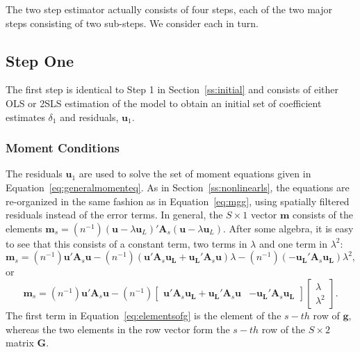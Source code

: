 \documentclass{article}
\begin{document}
 The two step estimator actually consists of four steps, each of the two major
 steps consisting of two sub-steps. We consider each in turn.
 
 \subsection{Step One}
 The first step is identical to Step 1 in Section~\ref{ss:initial} and consists of either
 OLS or 2SLS estimation of the model to obtain an initial set of 
 coefficient estimates $\delta_1$ and residuals, $\mathbf{u}_1$.
 
 \subsubsection{Moment Conditions}
 The residuals $\mathbf{u}_1$ are used to solve the set of moment equations given
 in Equation~\ref{eq:generalmomenteq}. As in Section~\ref{ss:nonlinearls}, the 
 equations are re-organized in the same fashion as in Equation~\ref{eq:mgg},
 using spatially filtered residuals instead of the error terms. 
 In general, the $S \times 1$ vector $\mathbf{m}$ consists of the elements
 $\mathbf{m}_s = (n^{-1}) (\mathbf{u} - \lambda \mathbf{u}_L) ' \mathbf{A}_s (\mathbf{u} - \lambda \mathbf{u}_L)$. After some algebra, it is easy to see that this consists of a constant term, two terms
 in $\lambda$ and one term in $\lambda^2$:
 \begin{equation*}
\mathbf{m}_s =  (n^{-1}) \mathbf{u'} \mathbf{A}_s \mathbf{u} - (n^{-1}) (\mathbf{u'} \mathbf{A}_s \mathbf{u_L} 
 +  \mathbf{u_L'} \mathbf{A}_s \mathbf{u} ) \lambda
 -  (n^{-1}) (- \mathbf{u_L'} \mathbf{A}_s \mathbf{u_L} ) \lambda^2,
 \end{equation*}
 or
 \begin{equation}\label{eq:elementsofg}
\mathbf{m}_s = (n^{-1}) \mathbf{u'} \mathbf{A}_s \mathbf{u}
- (n^{-1}) \left[ 
\begin{matrix}
\mathbf{u'} \mathbf{A}_s \mathbf{u_L} 
 +  \mathbf{u_L'} \mathbf{A}_s \mathbf{u}  & - \mathbf{u_L'} \mathbf{A}_s \mathbf{u_L} 
 \end{matrix}
  \right]
\left[
\begin{matrix}
\lambda\\
\lambda^2
\end{matrix}
\right].
\end{equation}
The first term in Equation~\ref{eq:elementsofg} is the element of the $s-th$ row of $\mathbf{g}$, whereas
the two elements in the row vector form the $s-th$ row of the $S \times 2$ matrix $\mathbf{G}$. 
\end{document}

